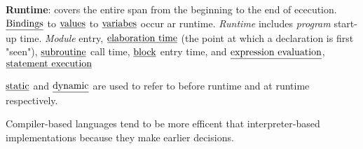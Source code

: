 \vskip 6pt
{\bf Runtime}: covers the entire span from the beginning to the end of ececution. $\underline{\hbox{Bindings}}$ to $\underline{\hbox{values}}$ to $\underline{\hbox{variabes}}$ occur ar runtime. {\it Runtime} includes {\it program} start-up time. {\it Module} entry, $\underline{\hbox{elaboration time}}$ (the point at which a declaration is first "seen"), $\underline{\hbox{subroutine}}$ call time, $\underline{\hbox{block}}$ entry time, and $\underline{\hbox{expression evaluation}}$, $\underline{\hbox{statement execution}}$

\vskip 6pt
$\underline{\hbox{static}}$ and $\underline{\hbox{dynamic}}$ are used to refer to before runtime and at runtime respectively.

\vskip 6pt
Compiler-based languages tend to be more efficent that interpreter-based implementations because they make earlier decisions.

\vfill\eject
\bye
